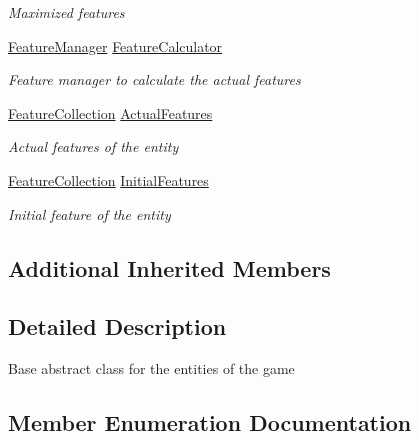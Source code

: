 \begin{DoxyCompactItemize}
\begin{DoxyCompactList}\small\item\em Maximized features \end{DoxyCompactList}\item 
\hyperlink{class_hel_project_1_1_features_1_1_feature_manager}{Feature\+Manager} \hyperlink{class_hel_project_1_1_game_world_1_1_entities_1_1_h_entity_a80aaee359bc963011a0f34c1f27aa47c}{Feature\+Calculator}
\begin{DoxyCompactList}\small\item\em Feature manager to calculate the actual features \end{DoxyCompactList}\item 
\hyperlink{class_hel_project_1_1_features_1_1_feature_collection}{Feature\+Collection} \hyperlink{class_hel_project_1_1_game_world_1_1_entities_1_1_h_entity_ad2f5977677a00f45a3402f11391e8282}{Actual\+Features}
\begin{DoxyCompactList}\small\item\em Actual features of the entity \end{DoxyCompactList}\item 
\hyperlink{class_hel_project_1_1_features_1_1_feature_collection}{Feature\+Collection} \hyperlink{class_hel_project_1_1_game_world_1_1_entities_1_1_h_entity_a155d3d12d931e900e26d770c120ec361}{Initial\+Features}
\begin{DoxyCompactList}\small\item\em Initial feature of the entity \end{DoxyCompactList}\end{DoxyCompactItemize}
\subsection*{Additional Inherited Members}


\subsection{Detailed Description}
Base abstract class for the entities of the game 



\subsection{Member Enumeration Documentation}
\hypertarget{class_hel_project_1_1_game_world_1_1_entities_1_1_h_entity_af0044d8a58b65254f673f8c0ecfecdea}{}

